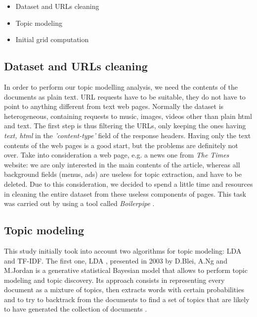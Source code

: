 \begin{itemize}
	\item Dataset and URLs cleaning\\
	\item Topic modeling\\
	\item Initial grid computation\\
\end{itemize}

\subsection{Dataset and URLs cleaning}

In order to perform our topic modelling analysis, we need the contents of the documents as plain text. URL requests have to be suitable, they do not have to point to anything different from text web pages. Normally the dataset is heterogeneous, containing requests to music, images, videos other than plain html and text. The first step is thus filtering the URLs, only keeping the ones having \emph{text, html} in the \emph{'content-type'} field of the response headers. Having only the text contents of the web pages is a good start, but the problems are definitely not over. Take into consideration a web page, e.g. a news one from \emph{The Times} website: we are only interested in the main contents of the article, whereas all background fields (menus, ads) are useless for topic extraction, and have to be deleted. Due to this consideration, we decided to spend a little time and resources in cleaning the entire dataset from these useless components of pages. This task was carried out by using a tool called \emph{Boilerpipe} \cite{BP}.\\




\subsection{Topic modeling}

This study initially took into account two algorithms for topic modeling: LDA and TF-IDF. 
The first one, LDA \cite{LDA, blei}, presented in 2003 by D.Blei, A.Ng and M.Jordan is a generative statistical Bayesian model that allows to perform topic modeling and topic discovery. Its approach consists in representing every document as a mixture of topics, then extracts words with certain probabilities and to try to backtrack from the documents to find a set of topics that are likely to have generated the collection of documents  \cite{LDA, blei, echen}.

